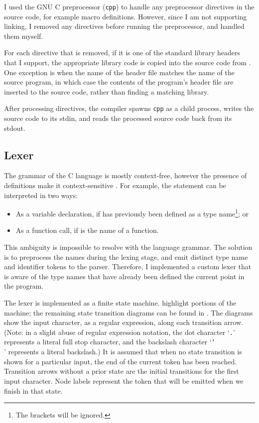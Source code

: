\documentclass[00-main.tex]{subfiles}
\begin{document}
I used the GNU C preprocessor (\texttt{cpp})  to handle any preprocessor directives in the source code, for example macro definitions.
However, since I am not supporting linking, I removed any  directives before running the preprocessor, and handled them myself.

For each  directive that is removed, if it is one of the standard library headers that I support, the appropriate library code is copied into the source code from .
One exception is when the name of the header file matches the name of the source program, in which case the contents of the program's header file are inserted to the source code, rather than finding a matching library.

After processing  directives, the compiler spawns \texttt{cpp} as a child process, writes the source code to its stdin, and reads the processed source code back from its stdout.

\subsection{Lexer}

The grammar of the C language is mostly context-free, however the presence of  definitions make it context-sensitive .
For example, the statement  can be interpreted in two ways:
\begin{itemize}
\item As a variable declaration, if  has previously been defined as a type name\footnote{The brackets will be ignored.}; or
\item As a function call, if  is the name of a function.
\end{itemize}

This ambiguity is impossible to resolve with the language grammar. The solution is to preprocess the  names during the lexing stage, and emit distinct type name and identifier tokens to the parser.
Therefore, I implemented a custom lexer that is aware of the type names that have already been defined the current point in the program.

The lexer is implemented as a finite state machine.  highlight portions of the machine; the remaining state transition diagrams can be found in .
The diagrams show the input character, as a regular expression, along each transition arrow. (Note: in a slight abuse of regular expression notation, the dot character `\texttt{.}' represents a literal full stop character, and the backslash character `\texttt{\char`\\}' represents a literal backslash.)
It is assumed that when no state transition is shown for a particular input, the end of the current token has been reached.
Transition arrows without a prior state are the initial transitions for the first input character.
Node labels represent the token that will be emitted when we finish in that state.
\end{document}
